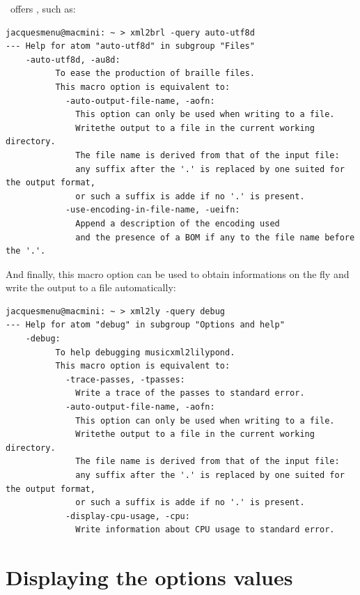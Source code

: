 \oahRepr\ offers , such as:
\begin{lstlisting}[language=Terminal]%%%JMI utf8 missing
jacquesmenu@macmini: ~ > xml2brl -query auto-utf8d
--- Help for atom "auto-utf8d" in subgroup "Files"
    -auto-utf8d, -au8d:
          To ease the production of braille files.
          This macro option is equivalent to:
            -auto-output-file-name, -aofn:
              This option can only be used when writing to a file.
              Writethe output to a file in the current working directory.
              The file name is derived from that of the input file:
              any suffix after the '.' is replaced by one suited for the output format,
              or such a suffix is adde if no '.' is present.
            -use-encoding-in-file-name, -ueifn:
              Append a description of the encoding used
              and the presence of a BOM if any to the file name before the '.'.
\end{lstlisting}

And finally, this macro option can be used to obtain informations on the fly and write the output to a file automatically:
\begin{lstlisting}[language=Terminal]
jacquesmenu@macmini: ~ > xml2ly -query debug
--- Help for atom "debug" in subgroup "Options and help"
    -debug:
          To help debugging musicxml2lilypond.
          This macro option is equivalent to:
            -trace-passes, -tpasses:
              Write a trace of the passes to standard error.
            -auto-output-file-name, -aofn:
              This option can only be used when writing to a file.
              Writethe output to a file in the current working directory.
              The file name is derived from that of the input file:
              any suffix after the '.' is replaced by one suited for the output format,
              or such a suffix is adde if no '.' is present.
            -display-cpu-usage, -cpu:
              Write information about CPU usage to standard error.
\end{lstlisting}



\section{Displaying the options values}

